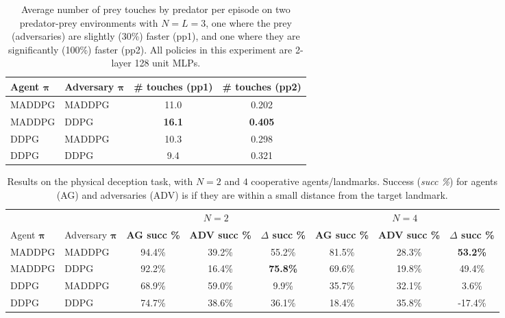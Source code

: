 \documentclass{article}
\newcommand{\pol}[0]{\pmb{\pi}}
\begin{document}
\begin{table*}[ht!]
\small
\centering
\begin{tabular}{l l c c}
\toprule
Agent $\pol$ & Adversary $\pol$ & \textbf{\# touches ({\sc pp1}) }&    \textbf{\# touches ({\sc pp2})} \\ \hline
MADDPG & MADDPG & 11.0 & 0.202  \\
MADDPG & DDPG &  \textbf{16.1} & \textbf{0.405} \\
DDPG & MADDPG & 10.3  & 0.298  \\
DDPG & DDPG & 9.4 & 0.321  \\
\bottomrule
\end{tabular}
\caption{\label{tab:simple_tag} Average number of prey touches by predator per episode on two predator-prey environments with $N=L=3$, one where the prey (adversaries) are slightly (30\%) faster ({\sc pp1}), and one where they are significantly (100\%) faster ({\sc pp2}). All policies in this experiment are 2-layer 128 unit MLPs. }
\end{table*}

\begin{table*}[ht!]
\fontsize{8.5}{9}\selectfont
\centering
\begin{tabular}{l l c c c c c c}
\toprule
 & & \multicolumn{3}{c}{ $N = 2$} & \multicolumn{3}{c}{ $N=4$} \\
Agent $\pol$ & Adversary $\pol$ & \textbf{AG succ \% }&    \textbf{ADV succ \%}& \textbf{$\Delta$ succ \%}& \textbf{AG succ \% }&    \textbf{ADV succ \%}& \textbf{$\Delta$ succ \%} \\ \hline
MADDPG & MADDPG & 94.4\% & 39.2\% & 55.2\% & 81.5\% & 28.3\% & \textbf{53.2\%} \\
MADDPG & DDPG &  92.2\% & 16.4\% & \textbf{75.8\%} & 69.6\% & 19.8\% & 49.4\% \\
DDPG & MADDPG & 68.9\%  & 59.0\% & 9.9\% & 35.7\% & 32.1\% & 3.6\% \\
DDPG & DDPG & 74.7\%  & 38.6\% & 36.1\% & 18.4\% & 35.8\% & -17.4\% \\
\bottomrule
\end{tabular}
\caption{\label{tab:simple_adversary} Results on the physical deception task, with $N=2$ and $4$ cooperative agents/landmarks. Success (\textit{succ \%}) for agents (AG) and adversaries (ADV) is if they are within a small distance from the target landmark. }
\end{table*}
\end{document}

